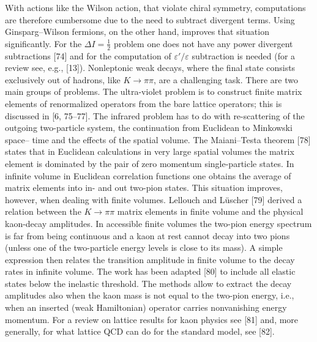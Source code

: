 With actions like the Wilson action, that violate chiral symmetry, computations are therefore cumbersome due to the need to subtract divergent terms.
Using Ginsparg--Wilson fermions, on the other hand, improves that situation
significantly. For the $\Delta I = \tfrac{1}{2}$ problem one does not have any power divergent
subtractions [74] and for the computation of $\varepsilon'/\varepsilon$ subtraction is needed (for a
review see, e.g., [13]).
Nonleptonic weak decays, where the final state consists exclusively out of
hadrons, like $K \to \pi\pi$, are a challenging task. There are two main groups
of problems. The ultra-violet problem is to construct finite matrix elements
of renormalized operators from the bare lattice operators; this is discussed in
[6, 75--77]. The infrared problem has to do with re-scattering of the outgoing
two-particle system, the continuation from Euclidean to Minkowski space--
time and the effects of the spatial volume.
The Maiani--Testa theorem [78] states that in Euclidean calculations in
very large spatial volumes the matrix element is dominated by the pair of
zero momentum single-particle states. In infinite volume in Euclidean correlation functions one obtains the average of matrix elements into in- and out
two-pion states. This situation improves, however, when dealing with finite
volumes. Lellouch and L\"uscher [79] derived a relation between the $K \to \pi\pi$
matrix elements in finite volume and the physical kaon-decay amplitudes. In
accessible finite volumes the two-pion energy spectrum is far from being continuous and a kaon at rest cannot decay into two pions (unless one of the
two-particle energy levels is close to its mass). A simple expression then relates the transition amplitude in finite volume to the decay rates in infinite
volume. The work has been adapted [80] to include all elastic states below the
inelastic threshold. The methods allow to extract the decay amplitudes also
when the kaon mass is not equal to the two-pion energy, i.e., when an inserted
(weak Hamiltonian) operator carries nonvanishing energy momentum. For a
review on lattice results for kaon physics see [81] and, more generally, for what
lattice QCD can do for the standard model, see [82].

